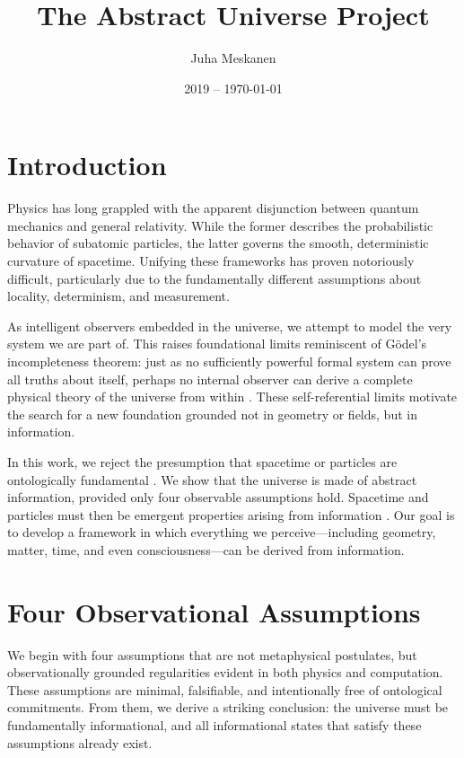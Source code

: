 \documentclass[11pt]{article}
\title{\LARGE The Abstract Universe Project}
\author{Juha Meskanen}
\date{2019 -- \today}
\begin{document}
\maketitle

\section{Introduction}

Physics has long grappled with the apparent disjunction between quantum mechanics and general relativity. While the former describes the probabilistic behavior of subatomic particles, the latter governs the smooth, deterministic curvature of spacetime. Unifying these frameworks has proven notoriously difficult, particularly due to the fundamentally different assumptions about locality, determinism, and measurement.

As intelligent observers embedded in the universe, we attempt to model the very system we are part of. This raises foundational limits reminiscent of Gödel's incompleteness theorem: just as no sufficiently powerful formal system can prove all truths about itself, perhaps no internal observer can derive a complete physical theory of the universe from within \cite{dyson2004godel}. These self-referential limits motivate the search for a new foundation grounded not in geometry or fields, but in information.

In this work, we reject the presumption that spacetime or particles are ontologically fundamental \cite{wheeler1990it} . We show that the universe is made of abstract information, provided only four observable assumptions hold. Spacetime and particles must then be emergent properties arising from information \cite{zuse1970calculating} \cite{tegmark2008mathematical}. Our goal is to develop a framework in which everything we perceive—including geometry, matter, time, and even consciousness—can be derived from information.

\section{Four Observational Assumptions}

We begin with four assumptions that are not metaphysical postulates, but observationally grounded regularities evident in both physics and computation. These assumptions are minimal, falsifiable, and intentionally free of ontological commitments. From them, we derive a striking conclusion: the universe must be fundamentally informational, and all informational states that satisfy these assumptions already exist.
\end{document}
